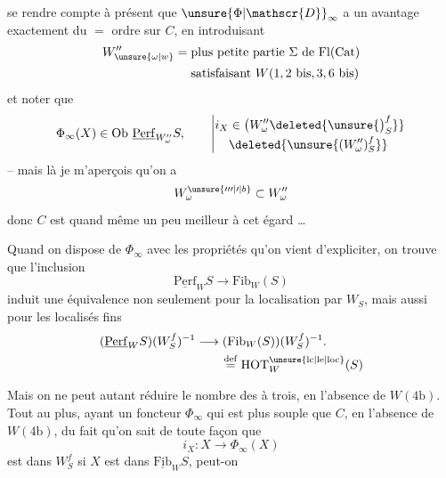 
se rendre compte à présent que $\unsure{\Phi|\mathscr{D}}_\infty$ a un avantage exactement du $=$ ordre sur $C$, en introduisant
\[
\begin{aligned}
W_{\unsure{\omega|w}}''={}&\text{plus petite partie }\Sigma\text{ de }\mathrm{Fl}(\mathrm{Cat})\\
&\text{satisfaisant }W(1,2\ \mathrm{bis},3,6\ \mathrm{bis})
\end{aligned}
\]
et noter que
\[
\Phi_\infty(X)\in\mathrm{Ob}\ \underline{\mathrm{Perf}}_{W_\omega''}S,\qquad
\left|\begin{aligned}
i_X&\in\bigl(W_\omega''\deleted{\unsure{\bigr)_S^f}}\bigr.\\[-2pt]
&\deleted{\unsure{(W_\omega'')_S^f}}
\end{aligned}\right.
\]
-- mais là je m'aperçois qu'on a
\[
W_\omega^{\unsure{\prime\prime\prime|\prime|b}}\subset W_\omega''
\]
donc $C$ est quand même un peu meilleur à cet égard \ldots

Quand on dispose de $\Phi_\infty$ avec les propriétés qu'on vient d'expliciter, on trouve que  l'inclusion
\[
\underline{\mathrm{Perf}}_W S\to\mathrm{Fib}_W(S)
\]
induit une équivalence non seulement pour la localisation par $W_S$, mais aussi pour les localisés fins
\[
\begin{aligned}
(\underline{\mathrm{Perf}}_W S)(W_S^f)^{-1}&\longrightarrow(\mathrm{Fib}_W(S))(W_S^f)^{-1}.\\
&\qquad\overset{\mathrm{def}}{=}\mathrm{HOT}_W^{\unsure{\mathrm{lc}|\mathrm{le}|\mathrm{loc}}}(S)
\end{aligned}
\]

Mais on ne peut  autant réduire le nombre des   à trois, en l'absence de $W(4\mathrm b)$. Tout au plus, ayant un foncteur $\Phi_\infty$ qui est plus souple que $C$, en l'absence de $W(4\mathrm b)$, du fait qu'on sait de toute façon que
\[
i_X:X\longrightarrow\Phi_\infty(X)
\]
est dans $W_S^f$ si $X$ est dans $\underline{\mathrm{Fib}}_W S$, peut-on
